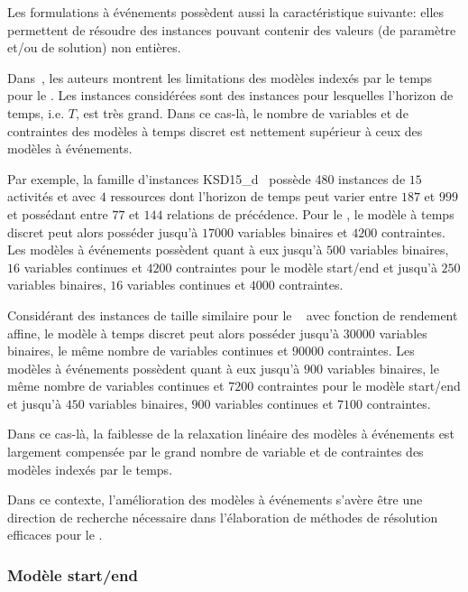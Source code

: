 Les formulations à événements possèdent aussi la caractéristique
suivante: elles permettent de résoudre des instances pouvant
contenir des valeurs (de paramètre et/ou de solution) non
entières.

Dans~\cite{modele_RCPSP}, les auteurs montrent les limitations des
modèles indexés par le temps pour le \RCPSP. Les instances considérées
sont des instances pour lesquelles l'horizon de temps, i.e. $T$, est
très grand. Dans ce cas-là, le nombre de variables et de contraintes
des modèles à temps discret est nettement supérieur à ceux des modèles
à événements. 

Par exemple, la famille d'instances KSD15\_d~\cite{theseOumar} possède
480 instances de $15$ activités et avec $4$ ressources dont l'horizon
de temps peut varier entre $187$ et $999$ et possédant entre $77$ et
$144$ relations de précédence. Pour le \RCPSP, le modèle à temps
discret peut alors posséder jusqu'à $17000$ variables binaires et
 $4200$ contraintes. Les modèles à événements possèdent quant à
eux jusqu'à $500$ variables binaires, $16$ variables continues et
$4200$ contraintes pour le modèle start/end et jusqu'à $250$ variables
binaires, $16$ variables continues et $4000$ contraintes.

Considérant des instances de taille similaire pour le \CECSP~ avec
fonction de rendement affine, le modèle à temps discret peut alors
posséder jusqu'à $30000$ variables binaires, le même nombre de
variables continues et $90000$ contraintes.  Les modèles à événements
possèdent quant à eux jusqu'à $900$ variables binaires, le même nombre
de variables continues et $7200$ contraintes pour le modèle start/end
et jusqu'à $450$ variables binaires, $900$ variables continues et
$7100$ contraintes.

Dans ce cas-là, la faiblesse de la relaxation linéaire des modèles à
événements est largement compensée par le grand nombre de variable et
de contraintes des modèles indexés par le temps.

Dans ce contexte, l'amélioration des modèles à événements s'avère être
une direction de recherche nécessaire dans l'élaboration de méthodes de
résolution efficaces pour le \RCPSP. 



\subsubsection{Modèle start/end}

